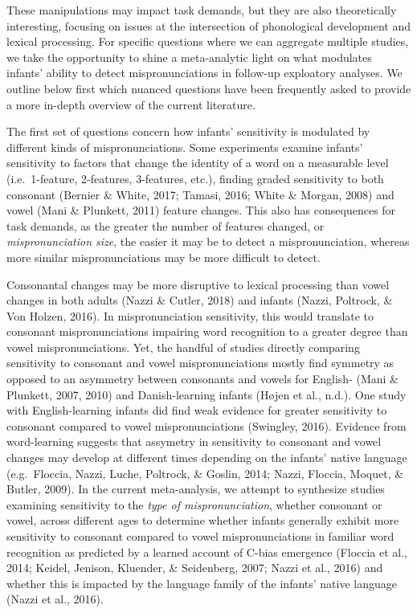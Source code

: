 \documentclass[man]{apa6}
\begin{document}
These manipulations may impact task demands, but they are also theoretically interesting, focusing on issues at the intersection of phonological development and lexical processing. For specific questions where we can aggregate multiple studies, we take the opportunity to shine a meta-analytic light on what modulates infants' ability to detect mispronunciations in follow-up exploatory analyses. We outline below first which nuanced questions have been frequently asked to provide a more in-depth overview of the current literature.

The first set of questions concern how infants' sensitivity is modulated by different kinds of mispronunciations. Some experiments examine infants' sensitivity to factors that change the identity of a word on a measurable level (i.e.~1-feature, 2-features, 3-features, etc.), finding graded sensitivity to both consonant (Bernier \& White, 2017; Tamasi, 2016; White \& Morgan, 2008) and vowel (Mani \& Plunkett, 2011) feature changes. This also has consequences for task demands, as the greater the number of features changed, or \emph{mispronunciation size}, the easier it may be to detect a mispronunciation, whereas more similar mispronunciations may be more difficult to detect.

Consonantal changes may be more disruptive to lexical processing than vowel changes in both adults (Nazzi \& Cutler, 2018) and infants (Nazzi, Poltrock, \& Von Holzen, 2016). In mispronunciation sensitivity, this would translate to consonant mispronunciations impairing word recognition to a greater degree than vowel mispronunciations. Yet, the handful of studies directly comparing sensitivity to consonant and vowel mispronunciations mostly find symmetry as opposed to an asymmetry between consonants and vowels for English- (Mani \& Plunkett, 2007, 2010) and Danish-learning infants (Højen et al., n.d.). One study with English-learning infants did find weak evidence for greater sensitivity to consonant compared to vowel mispronunciations (Swingley, 2016). Evidence from word-learning suggests that assymetry in sensitivity to consonant and vowel changes may develop at different times depending on the infants' native language (e.g.~Floccia, Nazzi, Luche, Poltrock, \& Goslin, 2014; Nazzi, Floccia, Moquet, \& Butler, 2009). In the current meta-analysis, we attempt to synthesize studies examining sensitivity to the \emph{type of mispronunciation}, whether consonant or vowel, across different ages to determine whether infants generally exhibit more sensitivity to consonant compared to vowel mispronunciations in familiar word recognition as predicted by a learned account of C-bias emergence (Floccia et al., 2014; Keidel, Jenison, Kluender, \& Seidenberg, 2007; Nazzi et al., 2016) and whether this is impacted by the language family of the infants' native language (Nazzi et al., 2016).
\end{document}
